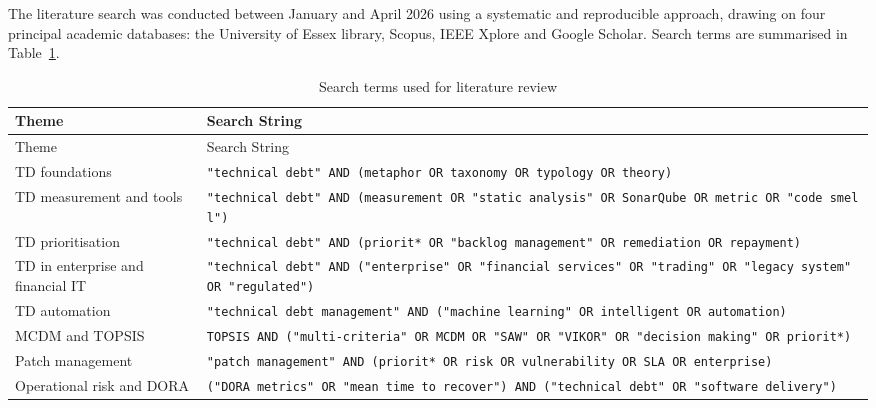 \documentclass[
  12pt,
  letterpaper,
  12pt,
  oneside,
  english,
  onehalfspacing,
  headsepline]{MastersDoctoralThesis}
\begin{document}
The literature search was conducted between January and April 2026 using
a systematic and reproducible approach, drawing on four principal
academic databases: the University of Essex library, Scopus, IEEE Xplore
and Google Scholar. Search terms are summarised in
Table~\ref{tbl-search-terms}.

\begin{samepage}
\scriptsize

\begin{longtable}[]{@{}
  >{\raggedright\arraybackslash}p{}
  >{\raggedright\arraybackslash}p{}@{}}
\caption{Search terms used for literature
review}\label{tbl-search-terms}\tabularnewline
\toprule\noalign{}
\begin{minipage}[b]{\linewidth}\raggedright
Theme
\end{minipage} & \begin{minipage}[b]{\linewidth}\raggedright
Search String
\end{minipage} \\
\midrule\noalign{}
\endfirsthead
\toprule\noalign{}
\begin{minipage}[b]{\linewidth}\raggedright
Theme
\end{minipage} & \begin{minipage}[b]{\linewidth}\raggedright
Search String
\end{minipage} \\
\midrule\noalign{}
\endhead
\bottomrule\noalign{}
\endlastfoot
TD foundations &
\texttt{"technical\ debt"\ AND\ (metaphor\ OR\ taxonomy\ OR\ typology\ OR\ theory)} \\
TD measurement and tools &
\texttt{"technical\ debt"\ AND\ (measurement\ OR\ "static\ analysis"\ OR\ SonarQube\ OR\ metric\ OR\ "code\ smell")} \\
TD prioritisation &
\texttt{"technical\ debt"\ AND\ (priorit*\ OR\ "backlog\ management"\ OR\ remediation\ OR\ repayment)} \\
TD in enterprise and financial IT &
\texttt{"technical\ debt"\ AND\ ("enterprise"\ OR\ "financial\ services"\ OR\ "trading"\ OR\ "legacy\ system"\ OR\ "regulated")} \\
TD automation &
\texttt{"technical\ debt\ management"\ AND\ ("machine\ learning"\ OR\ intelligent\ OR\ automation)} \\
MCDM and TOPSIS &
\texttt{TOPSIS\ AND\ ("multi-criteria"\ OR\ MCDM\ OR\ "SAW"\ OR\ "VIKOR"\ OR\ "decision\ making"\ OR\ priorit*)} \\
Patch management &
\texttt{"patch\ management"\ AND\ (priorit*\ OR\ risk\ OR\ vulnerability\ OR\ SLA\ OR\ enterprise)} \\
Operational risk and DORA &
\texttt{("DORA\ metrics"\ OR\ "mean\ time\ to\ recover")\ AND\ ("technical\ debt"\ OR\ "software\ delivery")} \\
\end{longtable}

\end{samepage}
\end{document}
